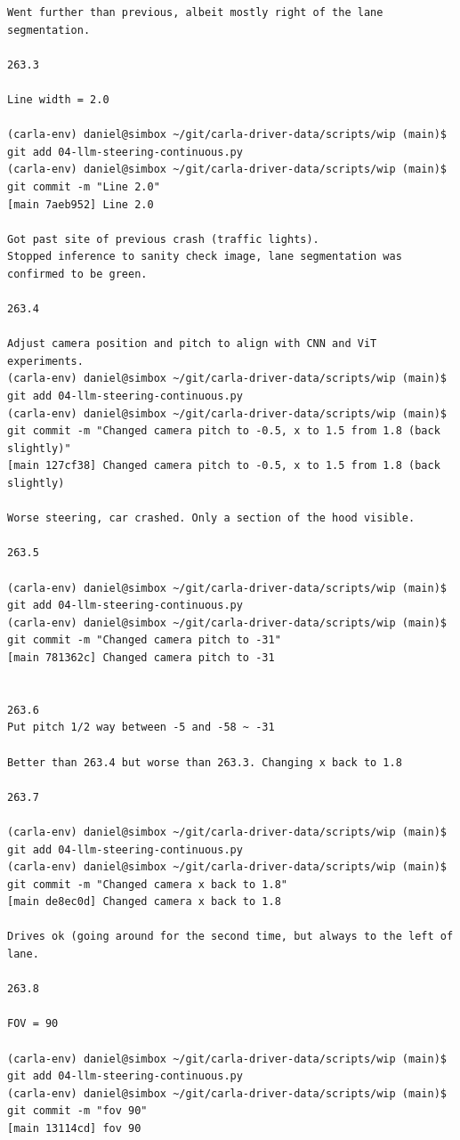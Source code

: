 \begin{verbatim}
Went further than previous, albeit mostly right of the lane segmentation.

263.3

Line width = 2.0

(carla-env) daniel@simbox ~/git/carla-driver-data/scripts/wip (main)$ git add 04-llm-steering-continuous.py 
(carla-env) daniel@simbox ~/git/carla-driver-data/scripts/wip (main)$ git commit -m "Line 2.0"
[main 7aeb952] Line 2.0

Got past site of previous crash (traffic lights).
Stopped inference to sanity check image, lane segmentation was confirmed to be green.

263.4

Adjust camera position and pitch to align with CNN and ViT experiments.
(carla-env) daniel@simbox ~/git/carla-driver-data/scripts/wip (main)$ git add 04-llm-steering-continuous.py 
(carla-env) daniel@simbox ~/git/carla-driver-data/scripts/wip (main)$ git commit -m "Changed camera pitch to -0.5, x to 1.5 from 1.8 (back slightly)"
[main 127cf38] Changed camera pitch to -0.5, x to 1.5 from 1.8 (back slightly)

Worse steering, car crashed. Only a section of the hood visible. 

263.5

(carla-env) daniel@simbox ~/git/carla-driver-data/scripts/wip (main)$ git add 04-llm-steering-continuous.py 
(carla-env) daniel@simbox ~/git/carla-driver-data/scripts/wip (main)$ git commit -m "Changed camera pitch to -31"
[main 781362c] Changed camera pitch to -31


263.6 
Put pitch 1/2 way between -5 and -58 ~ -31

Better than 263.4 but worse than 263.3. Changing x back to 1.8

263.7

(carla-env) daniel@simbox ~/git/carla-driver-data/scripts/wip (main)$ git add 04-llm-steering-continuous.py 
(carla-env) daniel@simbox ~/git/carla-driver-data/scripts/wip (main)$ git commit -m "Changed camera x back to 1.8"
[main de8ec0d] Changed camera x back to 1.8

Drives ok (going around for the second time, but always to the left of lane.

263.8

FOV = 90

(carla-env) daniel@simbox ~/git/carla-driver-data/scripts/wip (main)$ git add 04-llm-steering-continuous.py 
(carla-env) daniel@simbox ~/git/carla-driver-data/scripts/wip (main)$ git commit -m "fov 90"
[main 13114cd] fov 90


\end{verbatim}
